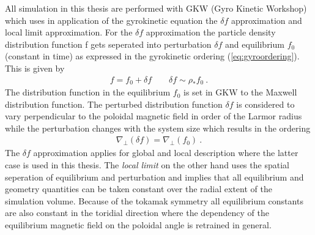 All simulation in this thesis are performed with GKW (Gyro Kinetic Workshop) which uses in application of the gyrokinetic equation the $\delta f$ approximation and local limit approximation. For the $\delta f$ approximation the particle density distribution function f gets seperated into perturbation $\delta f$ and equilibrium $f_0$ (constant in time) as expressed in the gyrokinetic ordering (\ref{eq:gyroordering}). This is given by
\begin{gather}
	f = f_0 + \delta f \qquad \delta f \sim \rho_* f_0~.
\end{gather}
The distribution function in the equilibrium $f_0$ is set in GKW to the Maxwell distribution function. The perturbed distribution function $\delta f$ is considered to vary perpendicular to the poloidal magnetic field in order of the Larmor radius while the perturbation changes with the system size which results in the ordering
\begin{gather}
	\nabla_\perp(\delta f) = \nabla_\perp (f_0)~.
\end{gather}
The $\delta f$ approximation applies for global and local description where the latter case is used in this thesis.
The \textit{local limit} on the other hand uses the spatial seperation of equilibrium and perturbation and implies that all equilibrium and geometry quantities can be taken constant over the radial extent of the simulation volume. Because of the tokamak symmetry all equilibrium constants are also constant in the toridial direction where the dependency of the equilibrium magnetic field on the poloidal angle is retrained in general. \\\bigskip

